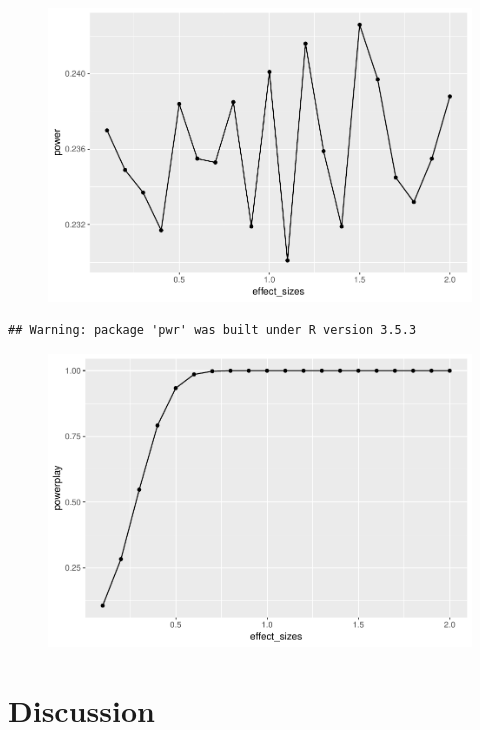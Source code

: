 \documentclass[man]{apa6}
\begin{document}
\begin{figure}
\centering
\includegraphics{Midterm_in_papaja_files/figure-latex/unnamed-chunk-3-1.pdf}
\caption{}
\end{figure}

\begin{verbatim}
## Warning: package 'pwr' was built under R version 3.5.3
\end{verbatim}

\begin{figure}
\centering
\includegraphics{Midterm_in_papaja_files/figure-latex/unnamed-chunk-3-2.pdf}
\caption{}
\end{figure}

\section{Discussion}\label{discussion}
\end{document}
